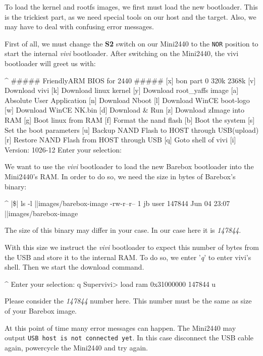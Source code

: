 To load the kernel and rootfs images, we first must load the new bootloader.
This is the trickiest part, as we need special tools on our host and the target.
Also, we may have to deal with confusing error messages.

First of all, we must change the \textbf{S2} switch on our Mini2440
to the \texttt{NOR} position to start the internal \textit{vivi} bootloader.
After switching on the Mini2440, the vivi bootloader will greet us
with:

\begin{ptxshell}[escapechar=|]{^}
##### FriendlyARM BIOS for 2440 #####
[x] bon part 0 320k 2368k
[v] Download vivi
[k] Download linux kernel
[y] Download root_yaffs image
[a] Absolute User Application
[n] Download Nboot
[l] Download WinCE boot-logo
[w] Download WinCE NK.bin
[d] Download & Run
[z] Download zImage into RAM
[g] Boot linux from RAM
[f] Format the nand flash
[b] Boot the system
[s] Set the boot parameters
[u] Backup NAND Flash to HOST through USB(upload)
[r] Restore NAND Flash from HOST through USB
[q] Goto shell of vivi
[i] Version: 1026-12
Enter your selection:
\end{ptxshell}

We want to use the \textit{vivi} bootloader to load the new Barebox bootloader
into the Mini2440's RAM. In order to do so, we need the size in bytes of
Barebox's binary:

\begin{ptxshell}[escapechar=|]{^}
|\$| ls -l |\ptxdistPlatformDir |images/barebox-image
-rw-r--r-- 1 jb user 147844 Jun 04 23:07 |\ptxdistPlatformDir |images/barebox-image
\end{ptxshell}

The size of this binary may differ in your case. In our case here it is
\textit{147844}.

With this size we instruct the \textit{vivi} bootloader to expect this number of
bytes from the USB and store it to the internal RAM. To do so, we enter
'\textit{q}' to enter vivi's shell. Then we start the download command.

\begin{ptxshell}[escapechar=|]{^}
Enter your selection: q
Supervivi> load ram 0x31000000 147844 u
\end{ptxshell}

Please consider the \textit{147844} number here. This number must be the same
as size of your Barebox image.

At this point of time many error messages can happen. The Mini2440
may output \texttt{USB host is not connected yet}. In this case disconnect
the USB cable again, powercycle the Mini2440 and try again.

